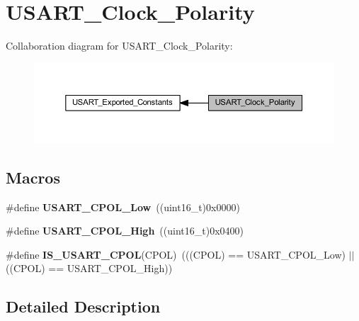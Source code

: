 \hypertarget{group___u_s_a_r_t___clock___polarity}{}\section{U\+S\+A\+R\+T\+\_\+\+Clock\+\_\+\+Polarity}
\label{group___u_s_a_r_t___clock___polarity}
Collaboration diagram for U\+S\+A\+R\+T\+\_\+\+Clock\+\_\+\+Polarity\+:
\nopagebreak
\begin{figure}[H]
\begin{center}
\leavevmode
\includegraphics[width=350pt]{group___u_s_a_r_t___clock___polarity}
\end{center}
\end{figure}
\subsection*{Macros}
\begin{DoxyCompactItemize}
\item 
\mbox{\label{group___u_s_a_r_t___clock___polarity_ga194d60b47d8042d39e843c52f3a6aa1a}} 
\#define {\bfseries U\+S\+A\+R\+T\+\_\+\+C\+P\+O\+L\+\_\+\+Low}~((uint16\+\_\+t)0x0000)
\item 
\mbox{\label{group___u_s_a_r_t___clock___polarity_ga4ba6946dd9f0b4fd38115f24798c210f}} 
\#define {\bfseries U\+S\+A\+R\+T\+\_\+\+C\+P\+O\+L\+\_\+\+High}~((uint16\+\_\+t)0x0400)
\item 
\mbox{\label{group___u_s_a_r_t___clock___polarity_ga833e9d2e85ab84658c7a7c18bd0bc8b9}} 
\#define {\bfseries I\+S\+\_\+\+U\+S\+A\+R\+T\+\_\+\+C\+P\+OL}(C\+P\+OL)~(((C\+P\+OL) == U\+S\+A\+R\+T\+\_\+\+C\+P\+O\+L\+\_\+\+Low) $\vert$$\vert$ ((C\+P\+OL) == U\+S\+A\+R\+T\+\_\+\+C\+P\+O\+L\+\_\+\+High))
\end{DoxyCompactItemize}


\subsection{Detailed Description}
